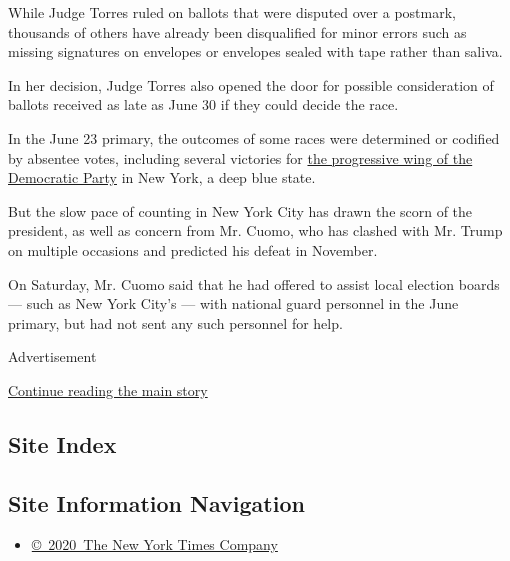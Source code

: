 While Judge Torres ruled on ballots that were disputed over a postmark,
thousands of others have already been disqualified for minor errors such
as missing signatures on envelopes or envelopes sealed with tape rather
than saliva.

In her decision, Judge Torres also opened the door for possible
consideration of ballots received as late as June 30 if they could
decide the race.

In the June 23 primary, the outcomes of some races were determined or
codified by absentee votes, including several victories for
\href{https://www.nytimes3xbfgragh.onion/2020/07/24/nyregion/progressive-primaries-ny-legislature.html?searchResultPosition=1}{the
progressive wing of the Democratic Party} in New York, a deep blue
state.

But the slow pace of counting in New York City has drawn the scorn of
the president, as well as concern from Mr. Cuomo, who has clashed with
Mr. Trump on multiple occasions and predicted his defeat in November.

On Saturday, Mr. Cuomo said that he had offered to assist local election
boards --- such as New York City's --- with national guard personnel in
the June primary, but had not sent any such personnel for help.

Advertisement

\protect\hyperlink{after-bottom}{Continue reading the main story}

\hypertarget{site-index}{%
\subsection{Site Index}\label{site-index}}

\hypertarget{site-information-navigation}{%
\subsection{Site Information
Navigation}\label{site-information-navigation}}

\begin{itemize}
\tightlist
\item
  \href{https://help.nytimes3xbfgragh.onion/hc/en-us/articles/115014792127-Copyright-notice}{©~2020~The
  New York Times Company}
\end{itemize}

